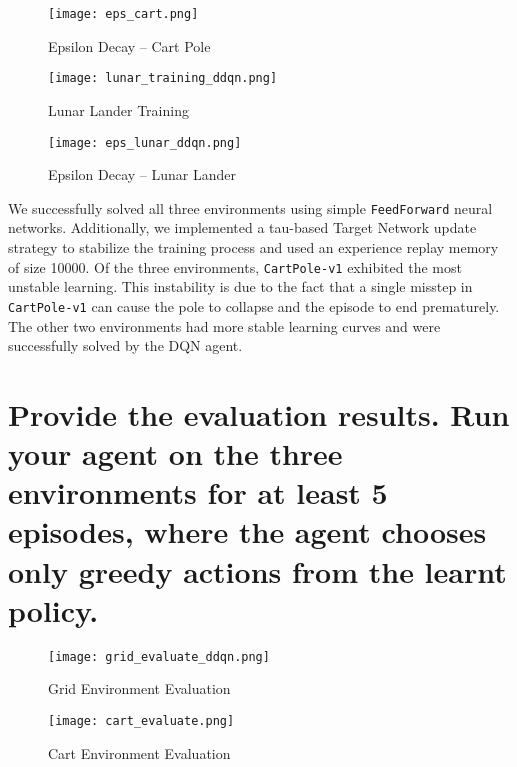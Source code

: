 \documentclass{article} %
\begin{document}
\begin{figure}[H]
    \begin{center}
        \texttt{[image: eps\_cart.png]}
    \end{center}
    \caption{Epsilon Decay -- Cart Pole}
\end{figure}

\begin{figure}[H]
    \begin{center}
        \texttt{[image: lunar\_training\_ddqn.png]}
    \end{center}
    \caption{Lunar Lander Training}
\end{figure}

\begin{figure}[H]
    \begin{center}
        \texttt{[image: eps\_lunar\_ddqn.png]}
    \end{center}
    \caption{Epsilon Decay -- Lunar Lander}
\end{figure}

We successfully solved all three environments using simple \verb|FeedForward| neural networks. Additionally, we implemented a tau-based Target Network update strategy to stabilize the training process and used an experience replay memory of size 10000. Of the three environments, \verb|CartPole-v1| exhibited the most unstable learning. This instability is due to the fact that a single misstep in \verb|CartPole-v1| can cause the pole to collapse and the episode to end prematurely. The other two environments had more stable learning curves and were successfully solved by the DQN agent.

\section{Provide the evaluation results. Run your agent on the three environments for at least 5 episodes, where the agent chooses only greedy actions from the learnt policy.}

\begin{figure}[H]
    \begin{center}
        \texttt{[image: grid\_evaluate\_ddqn.png]}
    \end{center}
    \caption{Grid Environment Evaluation}
\end{figure}

\begin{figure}[H]
    \begin{center}
        \texttt{[image: cart\_evaluate.png]}
    \end{center}
    \caption{Cart Environment Evaluation}
\end{figure}
\end{document}
